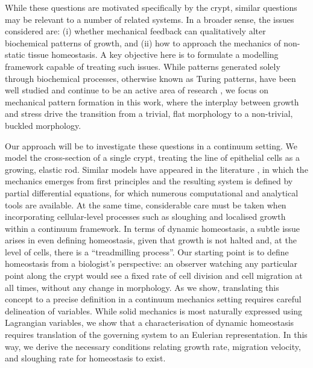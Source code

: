 While these questions are motivated specifically by the crypt, similar questions may be relevant to a number of related systems. In a broader sense, the issues considered are: (i) whether mechanical feedback can qualitatively alter biochemical patterns of growth, and (ii) how to approach the mechanics of non-static tissue homeostasis. A key objective here is to formulate a modelling framework capable of treating such issues. While patterns generated solely through biochemical processes, otherwise known as Turing patterns, have been well studied and continue to be an active area of research \cite{crampin1999reaction, krause2020one}, we focus on mechanical pattern formation in this work, where the interplay between growth and stress drive the transition from a trivial, flat morphology to a non-trivial, buckled morphology. 

Our approach will be to investigate these questions in a continuum setting. We model the cross-section of a single crypt, treating the line of epithelial cells as a growing, elastic rod. Similar models have appeared in the literature \cite{Edwards2007, Nelson2011}, in which the mechanics emerges from first principles and the resulting system is defined by partial differential equations, for which numerous computational and analytical tools are available. At the same time, considerable care must be taken when incorporating cellular-level processes such as sloughing and localised growth within a continuum framework. In terms of dynamic homeostasis, a subtle issue arises in even defining homeostasis, given that growth is not halted and, at the level of cells, there is a ``treadmilling process''. Our starting point is to define homeostasis from a biologist's perspective: an observer watching any particular point along the crypt would see a fixed rate of cell division and cell migration at all times, without any change in morphology. As we show, translating this concept to a precise definition in a continuum mechanics setting requires careful delineation of variables. While solid mechanics is most naturally expressed using Lagrangian variables, we show that a characterisation of dynamic homeostasis requires translation of the governing system to an Eulerian representation. In this way, we derive the necessary conditions relating growth rate, migration velocity, and sloughing rate for homeostasis to exist.

